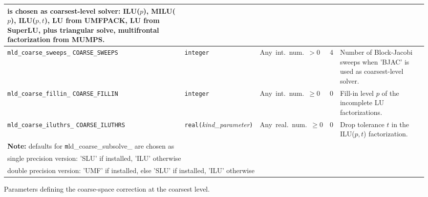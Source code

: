 \begin{center}
\begin{tabular}{|p{3.5cm}|l|p{3.2cm}|l|p{5cm}|}
                           is chosen as coarsest-level solver: ILU($p$), MILU($p$),
                           ILU($p,t$), LU from UMFPACK,
                           LU from SuperLU, plus triangular solve, multifrontal factorization from MUMPS. \\ \hline
\verb|mld_coarse_sweeps_| \break \verb|COARSE_SWEEPS| & \verb|integer|                         
                         & Any~int.~num.~$> 0$
                         & 4
                         & Number of Block-Jacobi sweeps when 'BJAC' is used as
                           coarsest-level solver. \\ \hline
\verb|mld_coarse_fillin_| \break \verb|COARSE_FILLIN| & \verb|integer|
                         & Any~int.~num.~$\ge 0$
                         & 0
                         & Fill-in level $p$ of the incomplete LU factorizations. \\ \hline
\verb|mld_coarse_iluthrs_|  \break \verb|COARSE_ILUTHRS| & \verb|real(|\emph{kind\_parameter}\verb|)|
                         & Any~real.~num.~$\ge 0$
                         & 0
                         & Drop tolerance $t$ in the ILU($p,t$) factorization. \\
\hline
\multicolumn{5}{|l|}{{\bfseries Note:} defaults for
  {\texttt mld\_coarse\_subsolve\_} are chosen as }\\ 
\multicolumn{5}{|l|}{single precision version: 'SLU' if installed, 'ILU' otherwise}\\
\multicolumn{5}{|l|}{double precision version: 'UMF' if installed,
  else 'SLU' if installed, 'ILU' otherwise}\\
\hline
\end{tabular}
\end{center}
\caption{Parameters defining the coarse-space correction at the coarsest
level.\label{tab:p_coarse}} 
\esideways



\clearpage

